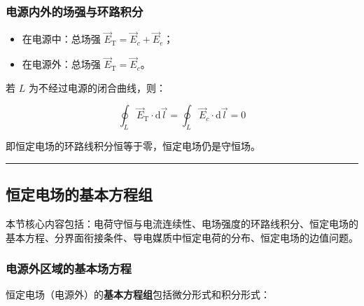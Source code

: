 \subsubsection{电源内外的场强与环路积分}
\begin{itemize}
    \item 在电源中：总场强 $\vec{E}_\text{T} = \vec{E}_c + \vec{E}_e$；
    \item 在电源外：总场强 $\vec{E}_\text{T} = \vec{E}_c$。
\end{itemize}

若 $L$ 为不经过电源的闭合曲线，则：
\begin{formulaBox}
\[
\oint_L \vec{E}_\text{T} \cdot \mathrm{d}\vec{l} = \oint_L \vec{E}_c \cdot \mathrm{d}\vec{l} = 0
\]
\end{formulaBox}
即恒定电场的环路线积分恒等于零，恒定电场仍是守恒场。

\vspace{0.8cm}\hrule\vspace{0.8cm}

\subsection{恒定电场的基本方程组}
本节核心内容包括：电荷守恒与电流连续性、电场强度的环路线积分、恒定电场的基本方程、分界面衔接条件、导电媒质中恒定电荷的分布、恒定电场的边值问题。

\subsubsection{电源外区域的基本场方程}
恒定电场（电源外）的\textbf{基本方程组}包括微分形式和积分形式：

